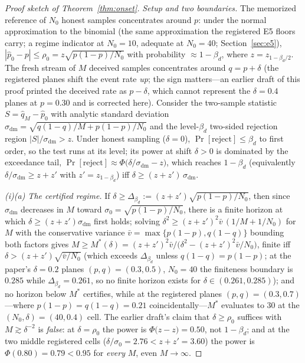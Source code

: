 \begin{proof}[Proof sketch of Theorem~\ref{thm:onset}]
\emph{Setup and two boundaries.} The memorized reference of $N_0$ honest
samples concentrates around $p$: under the normal approximation to the
binomial (the same approximation the registered E5 floors carry; a regime
indicator at $N_0=10$, adequate at $N_0=40$; Section~\ref{sec:e5}),
$|\hat p_0-p|\le\rho_0=z\sqrt{p(1-p)/N_0}$ with probability
$\approx1-\beta_d$, where $z=z_{1-\beta_d/2}$. The fresh stream of $M$
deceived samples concentrates around $q=p+\delta$ (the registered planes
shift the event rate \emph{up}; the sign matters---an earlier draft of this
proof printed the deceived rate as $p-\delta$, which cannot represent the
$\delta=0.4$ planes at $p=0.30$ and is corrected here). Consider the
two-sample statistic $S=\hat q_M-\hat p_0$ with analytic standard
deviation
$\sigma_{\mathrm{dm}}=\sqrt{q(1-q)/M+p(1-p)/N_0}$ and the level-$\beta_d$
two-sided rejection region $|S|/\sigma_{\mathrm{dm}}>z$. Under honest
sampling ($\delta=0$), $\Pr[\text{reject}]\le\beta_d$ to first order, so
the test runs at its level; its power at shift $\delta>0$ is dominated by
the exceedance tail,
$\Pr[\text{reject}]\approx\Phi\!\bigl(\delta/\sigma_{\mathrm{dm}}-z\bigr)$,
which reaches $1-\beta_d$ (equivalently $\delta/\sigma_{\mathrm{dm}}\ge z+z'$ with $z'=z_{1-\beta_d}$) iff
$\delta\ge(z+z')\,\sigma_{\mathrm{dm}}$.

\emph{(i)(a) The certified regime.} If
$\delta\ge\Delta_{\beta_d}:=(z+z')\sqrt{p(1-p)/N_0}$, then since
$\sigma_{\mathrm{dm}}$ decreases in $M$ toward
$\sigma_0=\sqrt{p(1-p)/N_0}$, there is a finite horizon at which
$\delta\ge(z+z')\sigma_{\mathrm{dm}}$ first holds; solving
$\delta^{2}\ge(z+z')^{2}\bar v\,(1/M+1/N_0)$ for $M$ with the conservative
variance $\bar v=\max\{p(1-p),q(1-q)\}$ bounding both factors gives
$M\ge M^{*}(\delta)=(z+z')^{2}\bar v/\bigl(\delta^{2}-(z+z')^{2}\bar
v/N_0\bigr)$, finite iff $\delta>(z+z')\sqrt{\bar v/N_0}$
(which exceeds $\Delta_{\beta_d}$ unless $q(1-q)=p(1-p)$; at the paper's
$\delta=0.2$ planes $(p,q)=(0.3,0.5)$, $N_0=40$ the finiteness boundary is
$0.285$ while $\Delta_{\beta_d}=0.261$, so no finite horizon exists for
$\delta\in(0.261,0.285)$); and no horizon below
$M^{*}$ certifies, while at the registered planes
$(p,q)=(0.3,0.7)$---where $p(1-p)=q(1-q)=0.21$ coincidentally---$M^{*}$
evaluates to $30$ at the $(N_0,\delta)=(40,0.4)$ cell. The earlier
draft's claim that $\delta\ge\rho_0$ suffices with $M\gtrsim\delta^{-2}$
is \emph{false}: at $\delta=\rho_0$ the power is
$\Phi\!\bigl(z-z\bigr)=0.50$, not $1-\beta_d$; and at the two middle
registered cells ($\delta/\sigma_0=2.76<z+z'=3.60$) the power is
$\Phi(0.80)=0.79<0.95$ for \emph{every} $M$, even $M\to\infty$.


\end{proof}
